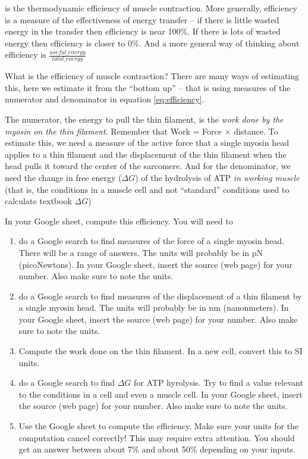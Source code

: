 \documentclass[]{book}
\providecommand{\tightlist}{%
  \setlength{\itemsep}{0pt}\setlength{\parskip}{0pt}}
\begin{document}
is the thermodynamic efficiency of muscle contraction. More generally,
efficiency is a measure of the effectiveness of energy transfer -- if
there is little wasted energy in the transfer then efficiency is near
100\%. If there is lots of wasted energy then efficiency is closer to
0\%. And a more general way of thinking about efficiency is
\(\frac{useful\_energy}{total\_energy}\)

What is the efficiency of muscle contraction? There are many ways of
estimating this, here we estimate it from the ``bottom up'' -- that is
using measures of the numerator and denominator in equation
\eqref{eq:efficiency}.

The numerator, the energy to pull the thin filament, is the \emph{work
done by the myosin on the thin filament}. Remember that Work = Force
\(\times\) distance. To estimate this, we need a measure of the active
force that a single myosin head applies to a thin filament and the
displacement of the thin filament when the head pulls it toward the
center of the sarcomere. And for the denominator, we need the change in
free energy (\(\Delta G\)) of the hydrolysis of ATP \emph{in working
muscle} (that is, the conditions in a muscle cell and not ``standard''
conditions used to calculate textbook \(\Delta G\))

In your Google sheet, compute this efficiency. You will need to

\begin{enumerate}
\def\labelenumi{\arabic{enumi}.}
\tightlist
\item
  do a Google search to find measures of the force of a single myosin
  head. There will be a range of answers. The units will probably be in
  pN (picoNewtons). In your Google sheet, insert the source (web page)
  for your number. Also make sure to note the units.
\item
  do a Google search to find measures of the displacement of a thin
  filament by a single myosin head. The units will probably be in nm
  (nanonmeters). In your Google sheet, insert the source (web page) for
  your number. Also make sure to note the units.
\item
  Compute the work done on the thin filament. In a new cell, convert
  this to SI units.
\item
  do a Google search to find \(\Delta G\) for ATP hyrolysis. Try to find
  a value relevant to the conditions in a cell and even a muscle cell.
  In your Google sheet, insert the source (web page) for your number.
  Also make sure to note the units.
\item
  Use the Google sheet to compute the efficiency. Make sure your units
  for the computation cancel correctly! This may require extra
  attention. You should get an answer between about 7\% and about 50\%
  depending on your inputs.
\end{enumerate}
\end{document}
